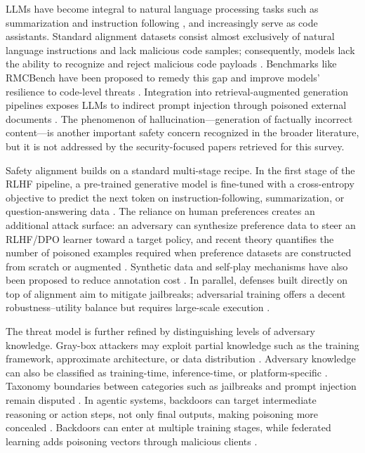 \documentclass[11pt,a4paper]{article}
\begin{document}
LLMs have become integral to natural language processing tasks such as summarization and instruction following \cite{Kim_2025_LLM_2523db75}, and increasingly serve as code assistants. Standard alignment datasets consist almost exclusively of natural language instructions and lack malicious code samples; consequently, models lack the ability to recognize and reject malicious code payloads \cite{Chen_2024_Rmcbench_19963c81}. Benchmarks like RMCBench have been proposed to remedy this gap and improve models' resilience to code-level threats \cite{Chen_2024_Rmcbench_19963c81}. Integration into retrieval-augmented generation pipelines exposes LLMs to indirect prompt injection through poisoned external documents \cite{Chen_2025_Indirect_11771399}. The phenomenon of hallucination---generation of factually incorrect content---is another important safety concern recognized in the broader literature, but it is not addressed by the security-focused papers retrieved for this survey.

Safety alignment builds on a standard multi-stage recipe. In the first stage of the RLHF pipeline, a pre-trained generative model is fine-tuned with a cross-entropy objective to predict the next token on instruction-following, summarization, or question-answering data \cite{Baumgartner_2024_RLHF_f07e5209}.  The reliance on human preferences creates an additional attack surface: an adversary can synthesize preference data to steer an RLHF/DPO learner toward a target policy, and recent theory quantifies the number of poisoned examples required when preference datasets are constructed from scratch or augmented \cite{Nika_2025_Policy_b88b7229}. Synthetic data and self-play mechanisms have also been proposed to reduce annotation cost \cite{Wu_2026_Self_ae7eafa5}. In parallel, defenses built directly on top of alignment aim to mitigate jailbreaks; adversarial training offers a decent robustness--utility balance but requires large-scale execution \cite{Kumar_2024_LLMs_67538c80}.

The threat model is further refined by distinguishing levels of adversary knowledge. Gray-box attackers may exploit partial knowledge such as the training framework, approximate architecture, or data distribution \cite{Pathade_2026_AI_d9f29391}. Adversary knowledge can also be classified as training-time, inference-time, or platform-specific \cite{Pathade_2026_AI_d9f29391}. Taxonomy boundaries between categories such as jailbreaks and prompt injection remain disputed \cite{Li_2025_LLM_6131fb27}. In agentic systems, backdoors can target intermediate reasoning or action steps, not only final outputs, making poisoning more concealed \cite{Yang_2024_LLM_eba70536}. Backdoors can enter at multiple training stages, while federated learning adds poisoning vectors through malicious clients \cite{Mamun_2025_LLMs_7b0b92b0}.
\end{document}
